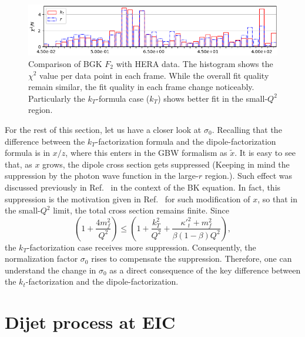 \documentclass[11pt]{article}
\numberwithin{equation}{section}
\numberwithin{table}{section}
\numberwithin{figure}{section}
\begin{document}
\begin{figure}[p]
\includegraphics[width=\textwidth,height=0.2\textwidth]{./plots/Figure_2-3.png}
\caption{Comparison of BGK $F_2$ with HERA data. The histogram shows the $\chi^2$ value per data point in each frame. While the overall fit quality remain similar, the fit quality in each frame change noticeably. Particularly the $k_T$-formula case ($k_T$) shows better fit in the small-$Q^2$ region.}
\label{fig:BGK-Grid}
\end{figure}
For the rest of this section, let us have a closer look at $\sigma_0$. 
Recalling that the difference between the $k_T$-factorization formula and the dipole-factorization formula is in $x/z$, where this enters in the GBW formalism as $\tilde{x}$. It is easy to see that, as $x$ grows, the dipole cross section gets suppressed (Keeping in mind the suppression by the photon wave function in the large-$r$ region.). Such effect was discussed previously in Ref.~\cite{Kutak:2004ym} in the context of the BK equation. In fact, this suppression is the motivation given in Ref.~\cite{Golec-Biernat:1998zce} for such modification of $x$, so that in the small-$Q^2$ limit, the total cross section remains finite.    
Since 
\begin{equation}
\left(1+\frac{4 m_f^2}{Q^2}\right)\leq\left(1+\frac{k_T^2}{Q^2}+\frac{{\kappa'}_t^2+m_f^2}{\beta(1-\beta)Q^2}\right),
\end{equation}
the $k_T$-factorization case receives more suppression. Consequently, the normalization factor $\sigma_0$ rises to compensate the suppression. 
Therefore, one can understand the change in $\sigma_0$ as a direct consequence of the key difference between the $k_t$-factorization and the dipole-factorization.
%
\section{Dijet process at EIC}
\label{Dijet process at EIC}
%
\end{document}
